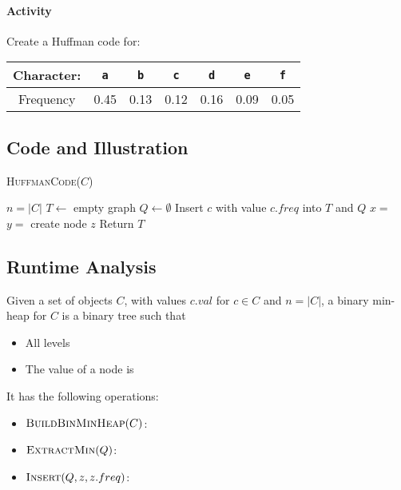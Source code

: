 \documentclass[11  pt]{article}
\newcommand{\tta}{\tt{a}}
\newcommand{\ttb}{\tt{b}}
\newcommand{\ttc}{\tt{c}}
\newcommand{\tte}{\tt{e}}
\newcommand{\ttd}{\tt{d}}
\newcommand{\ttf}{\tt{f}}
\begin{document}
\paragraph{Activity} Create a Huffman code for:
\begin{tabular}{c c c c c c c}
	Character: &  \tta & \ttb & \ttc & \ttd & \tte & \ttf \\
	\hline
	Frequency & 0.45 & 0.13 & 0.12 & 0.16 & 0.09 & 0.05 
\end{tabular} 

\newpage

\subsection{Code and Illustration}
\begin{algorithm}[t]
	\textsc{HuffmanCode}($C$)
	\begin{algorithmic}
		\State $n =|C|$
		\State $T \leftarrow$ empty graph 
		\State $Q \leftarrow \emptyset$ 
		\State Insert $c$ with value $c.freq$ into $T$ and $Q$
		\EndFor
		\State $x = $ %
		\State $y = $ %
		\State create node $z$
		\State 
		\State 
		\State 
		\State
		\State 
		\State
		\State 
		\EndFor
		\State Return $T$
	\end{algorithmic}
\end{algorithm}
\newpage

\subsection{Runtime Analysis}
Given a set of objects $C$, with values $c.val$ for $c \in C$ and $n = |C|$, a binary min-heap for $C$ is a binary tree such that
\begin{itemize}
	\item All levels %
	\item The value of a node is %
\end{itemize}
It has the following operations:
\begin{itemize}
	\item $\textsc{BuildBinMinHeap}(C)$:  \\%
	\item $\textsc{ExtractMin}(Q)$: \\
	
	\item $\textsc{Insert}(Q,z,z.freq)$: \\ %
\end{itemize}
\end{document}

